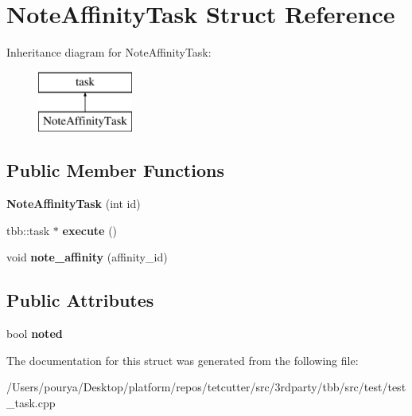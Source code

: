 \hypertarget{structNoteAffinityTask}{}\section{Note\+Affinity\+Task Struct Reference}
\label{structNoteAffinityTask}
Inheritance diagram for Note\+Affinity\+Task\+:\begin{figure}[H]
\begin{center}
\leavevmode
\includegraphics[height=2.000000cm]{structNoteAffinityTask}
\end{center}
\end{figure}
\subsection*{Public Member Functions}
\begin{DoxyCompactItemize}
\item 
\hypertarget{structNoteAffinityTask_ae6da33a6d6858fe83da153f05e06b0a0}{}{\bfseries Note\+Affinity\+Task} (int id)\label{structNoteAffinityTask_ae6da33a6d6858fe83da153f05e06b0a0}

\item 
\hypertarget{structNoteAffinityTask_aa5e6fc7a486c1b252f97c805e52a7cb8}{}tbb\+::task $\ast$ {\bfseries execute} ()\label{structNoteAffinityTask_aa5e6fc7a486c1b252f97c805e52a7cb8}

\item 
\hypertarget{structNoteAffinityTask_a6b785ed94098d04cb85b7b958955263a}{}void {\bfseries note\+\_\+affinity} (affinity\+\_\+id)\label{structNoteAffinityTask_a6b785ed94098d04cb85b7b958955263a}

\end{DoxyCompactItemize}
\subsection*{Public Attributes}
\begin{DoxyCompactItemize}
\item 
\hypertarget{structNoteAffinityTask_aa75234aee836c7041e84119589280d56}{}bool {\bfseries noted}\label{structNoteAffinityTask_aa75234aee836c7041e84119589280d56}

\end{DoxyCompactItemize}


The documentation for this struct was generated from the following file\+:\begin{DoxyCompactItemize}
\item 
/\+Users/pourya/\+Desktop/platform/repos/tetcutter/src/3rdparty/tbb/src/test/test\+\_\+task.\+cpp\end{DoxyCompactItemize}
